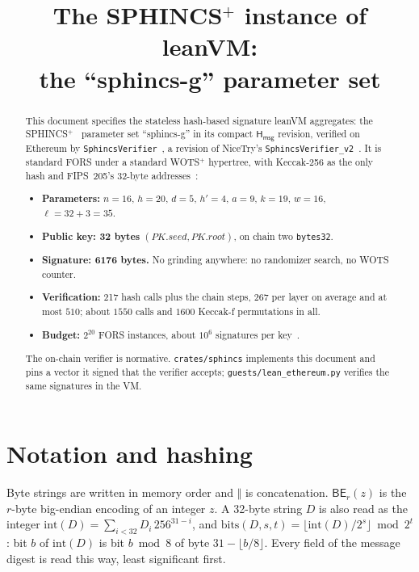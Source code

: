 \documentclass[11pt]{article}
\title{The SPHINCS$^+$ instance of leanVM:\\ the ``sphincs-g'' parameter set}
\author{}
\date{}
\newcommand{\concat}{\mathbin\Vert}
\newcommand{\Hmsg}{\mathsf{H_{msg}}}
\newcommand{\BE}{\mathsf{BE}}
\newcommand{\seed}{\mathit{PK.seed}}
\newcommand{\pkroot}{\mathit{PK.root}}
\begin{document}
\maketitle

\begin{abstract}
This document specifies the stateless hash-based signature leanVM aggregates: the SPHINCS$^+$~\cite{SPHINCSPLUS} parameter set ``sphincs-g'' in its compact $\Hmsg$ revision, verified on Ethereum by \texttt{SphincsVerifier}~\cite{SPHINCSG}, a revision of NiceTry's \texttt{SphincsVerifier\_v2}~\cite{NICETRYV2,NICETRYDOCS}. It is standard FORS under a standard WOTS$^+$ hypertree, with Keccak-256 as the only hash and FIPS~205's 32-byte addresses~\cite{FIPS205}:
\begin{itemize}
  \item \textbf{Parameters:} $n=16$, $h=20$, $d=5$, $h'=4$, $a=9$, $k=19$, $w=16$, $\ell=32+3=35$.
  \item \textbf{Public key: 32 bytes} $(\seed,\pkroot)$, on chain two \texttt{bytes32}.
  \item \textbf{Signature: 6176 bytes.} No grinding anywhere: no randomizer search, no WOTS counter.
  \item \textbf{Verification:} 217 hash calls plus the chain steps, $267$ per layer on average and at most $510$; about $1550$ calls and $1600$ Keccak-f permutations in all.
  \item \textbf{Budget:} $2^{20}$ FORS instances, about $10^6$ signatures per key~\cite{NICETRYDOCS}.
\end{itemize}
The on-chain verifier is normative. \texttt{crates/sphincs} implements this document and pins a vector it signed that the verifier accepts; \texttt{guests/lean\_ethereum.py} verifies the same signatures in the VM.
\end{abstract}

\section{Notation and hashing}
\label{sec:hashing}

Byte strings are written in memory order and $\concat$ is concatenation.
$\BE_r(z)$ is the $r$-byte big-endian encoding of an integer $z$. A 32-byte string
$D$ is also read as the integer $\mathrm{int}(D)=\sum_{i<32} D_i\,256^{31-i}$, and
$\mathrm{bits}(D,s,t)=\lfloor \mathrm{int}(D)/2^s\rfloor \bmod 2^t$: bit $b$ of
$\mathrm{int}(D)$ is bit $b\bmod 8$ of byte $31-\lfloor b/8\rfloor$. Every field of the message digest is read this way, least significant first.
\end{document}
